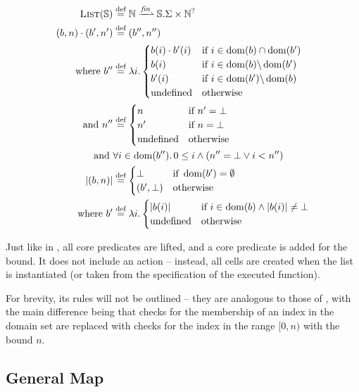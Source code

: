 \begin{align*}
	\List(\mmdl) &\defeq \nats \finmap \mmdl.\Sigma \times \nats^?\\
	(b,n)\cdot (b',n') &\defeq (b'', n'')\\
	\text{where } b''&\defeq \lambda i.\begin{cases}
		b(i)\cdot b'(i)&\If~i\in \dom(b)\cap\dom(b')\\
		b(i) &\If~i\in \dom(b) \backslash \dom(b')\\
		b'(i) &\If~i\in \dom(b') \backslash \dom(b)\\
		\text{undefined}&\Otherwise
	\end{cases}\\
	\text{and }n''&\defeq\begin{cases}
		n&\If~n'=\bot\\
		n'&\If~n=\bot\\
		\text{undefined}&\Otherwise
	\end{cases}\\
	\text{and }& \forall i\in\dom(b'')\ldotp 0\leq i \land (n'' = \bot \lor i < n'')\\
	|(b, n)| &\defeq \begin{cases}
		\bot &\If~\dom(b')=\emptyset\\
		(b',\bot) &\Otherwise
	\end{cases}\\
	\text{where }b'&\defeq\lambda i.\begin{cases}
		|b(i)| &\If~ i\in\dom(b) \land |b(i)| \neq \bot\\
		\text{undefined} &\Otherwise
	\end{cases}
\end{align*}

Just like in \PMap{}, all core predicates are lifted, and a \bound{} core predicate is added for the bound. It does not include an \alloc{} action -- instead, all cells are created when the list is instantiated (or taken from the specification of the executed function).

For brevity, its rules will not be outlined -- they are analogous to those of \PMap{}, with the main difference being that checks for the membership of an index in the domain set are replaced with checks for the index in the range $[0,n)$ with the bound $n$.

\subsection{General Map}


